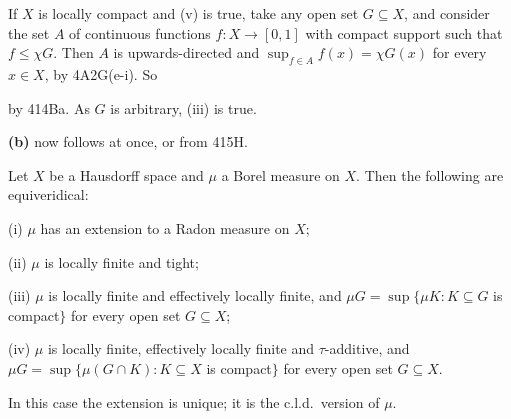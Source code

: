 {\medskip

 If $X$ is locally compact and (v) is
true, take any open set $G\subseteq X$, and consider
the set $A$ of continuous functions $f:X\to[0,1]$
with compact support such that $f\le\chi G$.
Then $A$ is upwards-directed and $\sup_{f\in A}f(x)=\chi G(x)$
for every $x\in X$, by 4A2G(e-i).   So


\noindent by 414Ba.   As $G$ is arbitrary, (iii) is true.

\medskip

{\bf (b)} now follows at once, or from 415H.
}%

 Let $X$ be a Hausdorff space and $\mu$ a
Borel measure on $X$.   Then the following are equiveridical:

\quad(i) $\mu$ has an extension to a Radon measure on $X$;

\quad(ii) $\mu$ is locally finite and tight;

\quad(iii) $\mu$ is locally finite and effectively locally finite, and
$\mu G=\sup\{\mu K:K\subseteq G$ is compact$\}$ for every open set
$G\subseteq X$;

\quad(iv) $\mu$ is locally finite,
effectively locally finite and $\tau$-additive,
and $\mu G=\sup\{\mu(G\cap K):K\subseteq X$ is compact$\}$ for every
open set $G\subseteq X$.

In this case the extension is unique;  it is the c.l.d.\ version
of $\mu$.

